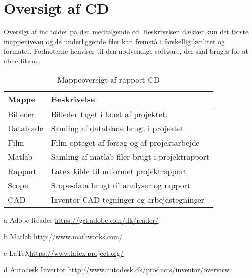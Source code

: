 \newpage
\section{Oversigt af CD}\label{bilag:cd}
Oversigt af indholdet på den medfølgende cd. Beskrivelsen dækker kun det første mappeniveau og de underliggende filer kan fremstå i forskellig kvalitet og formater. Fodnoterne henviser til den nødvendige software, der skal bruges for at åbne filerne.

\begin{table}[h!]
\centering
\caption{Mappeoversigt af rapport CD}
\label{tab:ordliste}
\begin{threeparttable}
\begin{tabular}{l l}
\toprule
\multicolumn{1}{l}{Mappe}       &
\multicolumn{1}{l}{Beskrivelse}  \\ 
\midrule
Billeder					& Billeder taget i løbet af projektet. \\
Datablade					& Samling af datablade brugt i projektet \tnote{a}\\
Film						& Film optaget af forsøg og af projektarbejde \\
Matlab						& Samling af matlab filer brugt i projektrapport\tnote{b} \\
Rapport						& Latex kilde til udformet projektrapport\tnote{c} \\
Scope						& Scope-data brugt til analyser og rapport \\
CAD							& Inventor CAD-tegninger og arbejdstegninger\tnote{d} \\
\bottomrule
\end{tabular}
\begin{tablenotes}
\item[a] Adobe Reader  \url{https://get.adobe.com/dk/reader/}
\item[b] Matlab \url{http://www.mathworks.com/}
\item[c] \LaTeX \url{https://www.latex-project.org/}
\item[d] Autodesk Inventor \url{http://www.autodesk.dk/products/inventor/overview}
\end{tablenotes}
\end{threeparttable}
\end{table}
\label{LastPage}
